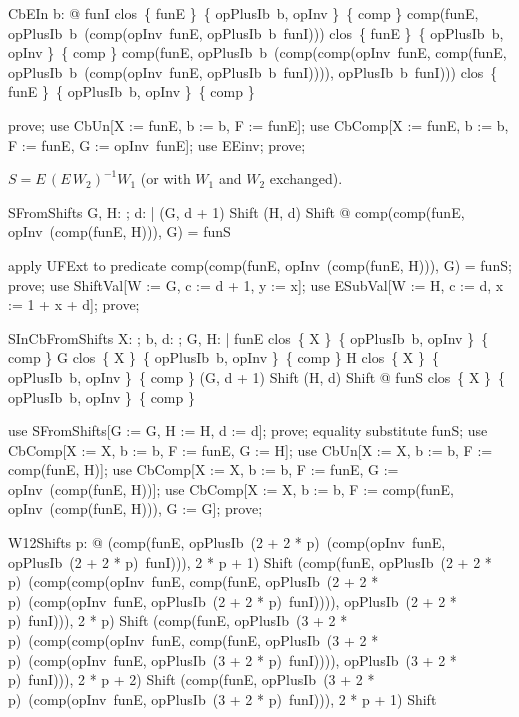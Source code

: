 \documentclass{article}
\begin{document}
\begin{theorem}{CbEIn}
  \forall b: \nat @ funI \in clos~\{ funE \}~\{ opPlusIb~b, opInv \}~\{ comp \} \land comp(funE, opPlusIb~b~(comp(opInv~funE, opPlusIb~b~funI))) \in clos~\{ funE \}~\{ opPlusIb~b, opInv \}~\{ comp \} \land comp(funE, opPlusIb~b~(comp(comp(opInv~funE, comp(funE, opPlusIb~b~(comp(opInv~funE, opPlusIb~b~funI)))), opPlusIb~b~funI))) \in clos~\{ funE \}~\{ opPlusIb~b, opInv \}~\{ comp \}
\end{theorem}

\begin{zproof}
prove;
use CbUn[X := funE, b := b, F := funE];
use CbComp[X := funE, b := b, F := funE, G := opInv~funE];
use EEinv;
prove;
\end{zproof}

$S = E\,(E\,W_2)^{-1} W_1$ (or with $W_1$ and $W_2$ exchanged).

\begin{theorem}{SFromShifts}
  \forall G, H: \nat \fun \nat; d: \nat | (G, d + 1) \in Shift \land (H, d) \in Shift @ comp(comp(funE, opInv~(comp(funE, H))), G) = funS
\end{theorem}

\begin{zproof}
apply UFExt to predicate comp(comp(funE, opInv~(comp(funE, H))), G) = funS;
prove;
use ShiftVal[W := G, c := d + 1, y := x];
use ESubVal[W := H, c := d, x := 1 + x + d];
prove;
\end{zproof}

\begin{theorem}{SInCbFromShifts}
  \forall X: \nat \fun \nat; b, d: \nat; G, H: \nat \fun \nat | funE \in clos~\{ X \}~\{ opPlusIb~b, opInv \}~\{ comp \} \land G \in clos~\{ X \}~\{ opPlusIb~b, opInv \}~\{ comp \} \land H \in clos~\{ X \}~\{ opPlusIb~b, opInv \}~\{ comp \} \land (G, d + 1) \in Shift \land (H, d) \in Shift @ funS \in clos~\{ X \}~\{ opPlusIb~b, opInv \}~\{ comp \}
\end{theorem}

\begin{zproof}
use SFromShifts[G := G, H := H, d := d];
prove;
equality substitute funS;
use CbComp[X := X, b := b, F := funE, G := H];
use CbUn[X := X, b := b, F := comp(funE, H)];
use CbComp[X := X, b := b, F := funE, G := opInv~(comp(funE, H))];
use CbComp[X := X, b := b, F := comp(funE, opInv~(comp(funE, H))), G := G];
prove;
\end{zproof}

\begin{theorem}{W12Shifts}
  \forall p: \nat @ (comp(funE, opPlusIb~(2 + 2 * p)~(comp(opInv~funE, opPlusIb~(2 + 2 * p)~funI))), 2 * p + 1) \in Shift \land (comp(funE, opPlusIb~(2 + 2 * p)~(comp(comp(opInv~funE, comp(funE, opPlusIb~(2 + 2 * p)~(comp(opInv~funE, opPlusIb~(2 + 2 * p)~funI)))), opPlusIb~(2 + 2 * p)~funI))), 2 * p) \in Shift \land (comp(funE, opPlusIb~(3 + 2 * p)~(comp(comp(opInv~funE, comp(funE, opPlusIb~(3 + 2 * p)~(comp(opInv~funE, opPlusIb~(3 + 2 * p)~funI)))), opPlusIb~(3 + 2 * p)~funI))), 2 * p + 2) \in Shift \land (comp(funE, opPlusIb~(3 + 2 * p)~(comp(opInv~funE, opPlusIb~(3 + 2 * p)~funI))), 2 * p + 1) \in Shift
\end{theorem}
\end{document}

